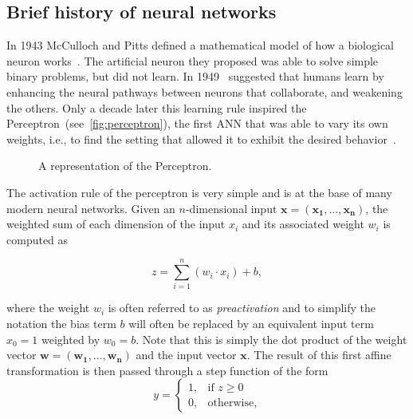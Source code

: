\subsection{Brief history of neural networks}
In 1943 McCulloch and Pitts defined a mathematical model of how a biological
neuron works~\citep{McCulloch43}. The artificial neuron they proposed was
able to solve simple binary problems, but did not learn. In 1949~\cite{Hebb49}
suggested that humans learn by enhancing the neural pathways between neurons
that collaborate, and weakening the others. Only a decade later this learning
rule inspired the Perceptron~(see~\autoref{fig:perceptron}), the first ANN that
was able to vary its own weights, i.e., to find the setting that allowed it to
exhibit the desired behavior~\citep{Rosenblatt57}.

\begin{figure}[t]
    \centering
    \begin{neuralnetwork} [nodespacing=6mm, layerspacing=23mm,
            maintitleheight=2.5em, layertitleheight=5em,
            height=3, toprow=true, nodesize=17pt,
            style={}, title={}, titlestyle={}]

        \outputlayer[count=1, text=\nodetextsigma]
        {\setdefaultlinklabel{\wilink}\linklayers}
        \redefinelayerspacing{18mm}
        \outputlayer[count=1, text=\nodetextstep]
        \linklayers
        \redefinelayerspacing{16mm}
        \outputlayer[count=1, text=\nodetexty]
        \linklayers
    \end{neuralnetwork}
    \centering
    \caption{\label{fig:perceptron}A representation of the Perceptron.}
\end{figure}

The activation rule of the perceptron is very simple and is at the base of many
modern neural networks. Given an $n$-dimensional input $\mathbf{x = (x_1,
\dots, x_n)}$, the weighted sum of each dimension of the input $x_i$ and its
associated weight $w_i$ is computed as

\begin{equation*}
    z = \sum_{i=1}^{n}(w_i \cdot x_i) + b,
\end{equation*}

\noindent where the weight $w_i$ is often referred to as \emph{preactivation}
and to simplify the notation the bias term $b$ will often be replaced by an
equivalent input term $x_0=1$ weighted by $w_0=b$. Note that this is simply the
dot product of the weight vector $\mathbf{w = (w_1, \dots, w_n)}$ and the input
vector $\mathbf{x}$. The result of this first affine transformation is then
passed through a step function of the form
\begin{equation*}
    y =
        \begin{cases}
            1,          & \text{if } z \geq 0 \\
            0,         & \text{otherwise},
        \end{cases}
\end{equation*}

